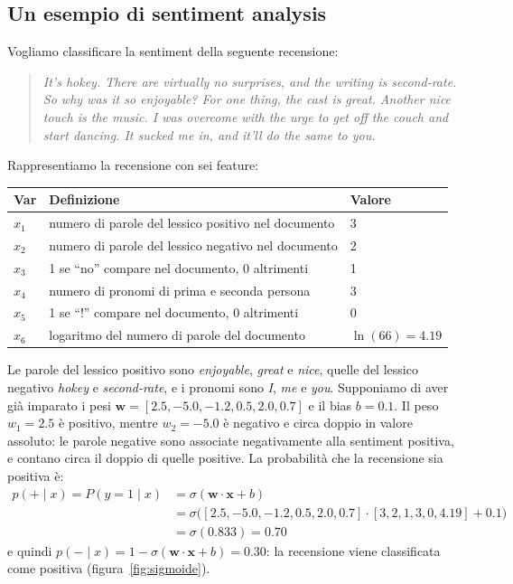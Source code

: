 \subsection{Un esempio di sentiment analysis}
Vogliamo classificare la sentiment della seguente recensione:
\begin{quote}
\textit{It's hokey. There are virtually no surprises, and the writing is second-rate. So why was it so enjoyable? For one thing, the cast is great. Another nice touch is the music. I was overcome with the urge to get off the couch and start dancing. It sucked me in, and it'll do the same to you.}
\end{quote}
Rappresentiamo la recensione con sei feature:
\begin{center}
\begin{tabular}{lll}
\toprule
Var & Definizione & Valore \\
\midrule
$x_1$ & numero di parole del lessico positivo nel documento & 3 \\
$x_2$ & numero di parole del lessico negativo nel documento & 2 \\
$x_3$ & 1 se \enquote{no} compare nel documento, 0 altrimenti & 1 \\
$x_4$ & numero di pronomi di prima e seconda persona & 3 \\
$x_5$ & 1 se \enquote{!} compare nel documento, 0 altrimenti & 0 \\
$x_6$ & logaritmo del numero di parole del documento & $\ln(66) = 4.19$ \\
\bottomrule
\end{tabular}
\end{center}
Le parole del lessico positivo sono \textit{enjoyable}, \textit{great} e \textit{nice}, quelle del lessico negativo \textit{hokey} e \textit{second-rate}, e i pronomi sono \textit{I}, \textit{me} e \textit{you}. Supponiamo di aver già imparato i pesi $\mathbf{w} = [2.5, -5.0, -1.2, 0.5, 2.0, 0.7]$ e il bias $b = 0.1$. Il peso $w_1 = 2.5$ è positivo, mentre $w_2 = -5.0$ è negativo e circa doppio in valore assoluto: le parole negative sono associate negativamente alla sentiment positiva, e contano circa il doppio di quelle positive. La probabilità che la recensione sia positiva è:
\begin{align}
p(+ \mid x) = P(y = 1 \mid x) &= \sigma(\mathbf{w} \cdot \mathbf{x} + b) \nonumber \\
&= \sigma\big([2.5, -5.0, -1.2, 0.5, 2.0, 0.7] \cdot [3, 2, 1, 3, 0, 4.19] + 0.1\big) \nonumber \\
&= \sigma(0.833) = 0.70
\end{align}
e quindi $p(- \mid x) = 1 - \sigma(\mathbf{w} \cdot \mathbf{x} + b) = 0.30$: la recensione viene classificata come positiva (figura~\ref{fig:sigmoide}).

